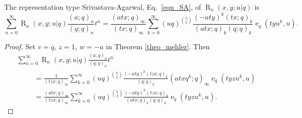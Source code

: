 \documentclass{cimart}
\DeclareMathOperator{\ope}{e}
\DeclareMathOperator{\opR}{R}
\begin{document}
\begin{corollary}\label{coro8}
The representation type Srivastava-Agarwal, Eq.~\eqref{eqn_SA}, of $\opR_{n}(x,y;u|q)$ is
\begin{equation}
        \sum_{n=0}^{\infty}\opR_{n}(x,y;u|q)\frac{(a;q)_{n}}{(q;q)_{n}}t^n
        =\frac{(atx;q)_{\infty}}{(tx;q)_{\infty}}\sum_{k=0}^{\infty}(uq)^{\binom{k}{2}}\frac{(-aty)^k(tx;q)_{k}}{(atx;q)_{k}(q;q)_{k}}\ope_{q}(tyu^k,u).
    \end{equation}    
\end{corollary}
\begin{proof}
Set $v=q$, $z=1$, $w=-a$ in Theorem \ref{theo_mehler}. Then
\begin{align*}
    &\sum_{n=0}^{\infty}\opR_{n}(x,y;u|q)\frac{(a;q)_{n}}{(q;q)_{n}}t^n\\
    &\hspace{1cm}=\frac{1}{(tzx;q)_{\infty}}\sum_{k=0}^{\infty}(uq)^{\binom{k}{2}}\frac{(-aty)^k(tzx;q)_{k}}{(q;q)_{k}}(atxq^k;q)_{\infty}\ope_{q}(tyzu^k,u)\\
    &\hspace{1cm}=\frac{(atx;q)_{\infty}}{(tzx;q)_{\infty}}\sum_{k=0}^{\infty}(uq)^{\binom{k}{2}}\frac{(-aty)^k(tzx;q)_{k}}{(atx;q)_{k}(q;q)_{k}}\ope_{q}(tyzu^k,u).
\end{align*}
\end{proof}
\end{document}
